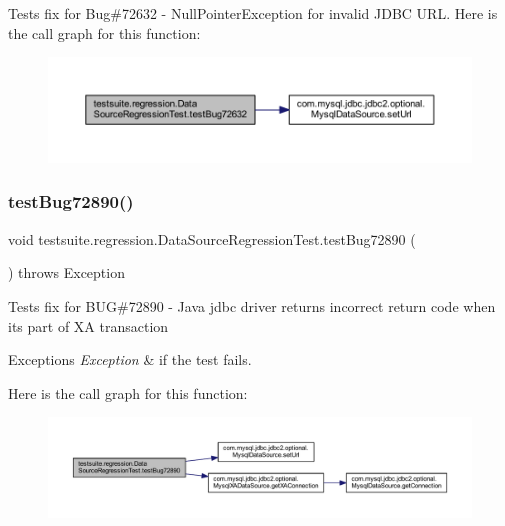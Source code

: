 Tests fix for Bug\#72632 -\/ Null\+Pointer\+Exception for invalid J\+D\+BC U\+RL. Here is the call graph for this function\+:
\nopagebreak
\begin{figure}[H]
\begin{center}
\leavevmode
\includegraphics[width=350pt]{classtestsuite_1_1regression_1_1_data_source_regression_test_abba082ff766209732ff52f20bfe77cae_cgraph}
\end{center}
\end{figure}
\mbox{\label{classtestsuite_1_1regression_1_1_data_source_regression_test_ae91b4203179883e6c257ba0484c9974e}} 
\subsubsection{\texorpdfstring{test\+Bug72890()}{testBug72890()}}
{\footnotesize\ttfamily void testsuite.\+regression.\+Data\+Source\+Regression\+Test.\+test\+Bug72890 (\begin{DoxyParamCaption}{ }\end{DoxyParamCaption}) throws Exception}

Tests fix for B\+UG\#72890 -\/ Java jdbc driver returns incorrect return code when it\textquotesingle{}s part of XA transaction


\begin{DoxyExceptions}{Exceptions}
{\em Exception} & if the test fails. \\
\hline
\end{DoxyExceptions}
Here is the call graph for this function\+:
\nopagebreak
\begin{figure}[H]
\begin{center}
\leavevmode
\includegraphics[width=350pt]{classtestsuite_1_1regression_1_1_data_source_regression_test_ae91b4203179883e6c257ba0484c9974e_cgraph}
\end{center}
\end{figure}


